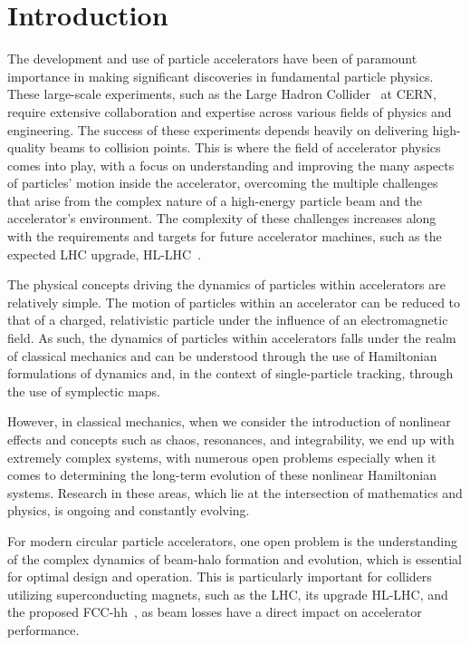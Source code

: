 


\chapter*{Introduction}

The development and use of particle accelerators have been of paramount importance in making significant discoveries in fundamental particle physics. These large-scale experiments, such as the Large Hadron Collider~\cite{Benedikt:823808} at CERN, require extensive collaboration and expertise across various fields of physics and engineering. The success of these experiments depends heavily on delivering high-quality beams to collision points. This is where the field of accelerator physics comes into play, with a focus on understanding and improving the many aspects of particles' motion inside the accelerator, overcoming the multiple challenges that arise from the complex nature of a high-energy particle beam and the accelerator's environment. The complexity of these challenges increases along with the requirements and targets for future accelerator machines, such as the expected LHC upgrade, HL-LHC~\cite{BejarAlonso:2749422, Arduini_2016}.

The physical concepts driving the dynamics of particles within accelerators are relatively simple. The motion of particles within an accelerator can be reduced to that of a charged, relativistic particle under the influence of an electromagnetic field. As such, the dynamics of particles within accelerators falls under the realm of classical mechanics and can be understood through the use of Hamiltonian formulations of dynamics and, in the context of single-particle tracking, through the use of symplectic maps.

However, in classical mechanics, when we consider the introduction of nonlinear effects and concepts such as chaos, resonances, and integrability, we end up with extremely complex systems, with numerous open problems especially when it comes to determining the long-term evolution of these nonlinear Hamiltonian systems. Research in these areas, which lie at the intersection of mathematics and physics, is ongoing and constantly evolving.

For modern circular particle accelerators, one open problem is the understanding of the complex dynamics of beam-halo formation and evolution, which is essential for optimal design and operation. This is particularly important for colliders utilizing superconducting magnets, such as the LHC, its upgrade HL-LHC, and the proposed FCC-hh~\cite{Benedikt:2651300}, as beam losses have a direct impact on accelerator performance.

